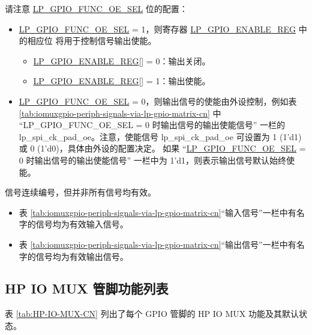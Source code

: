 \documentclass[main\_\_CN.tex]{subfiles}
\begin{document}
请注意 \hyperref[fielddesc:LPGPIOFUNCNOESEL]{LP\_GPIO\_FUNC\_OE\_SEL} 位的配置：

\begin{itemize}
    \item \hyperref[fielddesc:LPGPIOFUNCNOESEL]{LP\_GPIO\_FUNC\_OE\_SEL} = 1，则寄存器 \hyperref[regdesc:LPGPIOENABLEREG]{LP\_GPIO\_ENABLE\_REG} 中的相应位   将用于控制信号输出使能。
    \begin{itemize}
        \item \hyperref[regdesc:LPGPIOENABLEREG]{LP\_GPIO\_ENABLE\_REG}[] = 0：输出关闭。
        \item \hyperref[regdesc:LPGPIOENABLEREG]{LP\_GPIO\_ENABLE\_REG}[] = 1：输出使能。
    \end{itemize}
    \item \hyperref[fielddesc:LPGPIOFUNCNOESEL]{LP\_GPIO\_FUNC\_OE\_SEL} = 0，则输出信号的使能由外设控制，例如表 \ref{tab:iomuxgpio-periph-signals-via-lp-gpio-matrix-cn} 中 ``LP\_GPIO\_FUNC\_OE\_SEL = 0 时输出信号的输出使能信号” 一栏的 lp\_spi\_ck\_pad\_oe。注意，使能信号 lp\_spi\_ck\_pad\_oe 可设置为 1 (1'd1) 或 0 (1'd0)，具体由外设的配置决定。 如果 ``\hyperref[fielddesc:LPGPIOFUNCNOESEL]{LP\_GPIO\_FUNC\_OE\_SEL} = 0 时输出信号的输出使能信号” 一栏中为 1'd1，则表示输出信号默认始终使能。
\end{itemize}
\begin{tiplisting}
信号连续编号，但并非所有信号均有效。
\vspace{-1em}
\begin{itemize}
    \item 表 \ref{tab:iomuxgpio-periph-signals-via-lp-gpio-matrix-cn}“输入信号”一栏中有名字的信号均为有效输入信号。
    \item 表 \ref{tab:iomuxgpio-periph-signals-via-lp-gpio-matrix-cn}“输出信号”一栏中有名字的信号均为有效输出信号。
\end{itemize}
\end{tiplisting}

\begin{landscape}

\tableheaderLPSignalCN
\tablecontentLPSignal


\section{HP IO MUX 管脚功能列表}
\label{sec:hp_iomux_pads}
表 \ref{tab:HP-IO-MUX-CN} 列出了每个 GPIO 管脚的 HP IO MUX 功能及其默认状态。



\tableheaderHPFunctionsCN
\tablecontentHPFunctions
\end{landscape}
\end{document}
